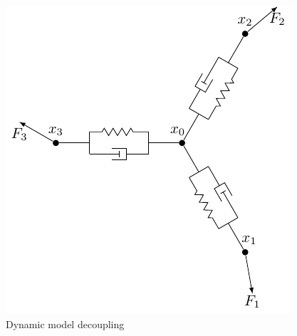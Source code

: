 \documentclass[letterpaper, 10 pt, conference]{ieeeconf}
\begin{document}
\begin{figure}
  \centering
  \includegraphics[scale=0.7]{figures/schematic.pdf}
  \caption{Dynamic model decoupling}
  \label{2D_schematic}
\end{figure}
\end{document}
